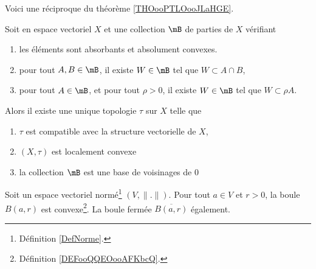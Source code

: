 Voici une réciproque du théorème \ref{THOooPTLOooJLaHGE}.

\begin{theorem}		\label{THOooKNXGooEebnxI}
	Soit en espace vectoriel \( X\) et une collection \( \mB\) de parties de \( X\) vérifiant
	\begin{enumerate}
		\item
		      les éléments sont absorbants et absolument convexes.
		\item
		      pour tout \( A,B\in \mB\), il existe \( W\in \mB\) tel que \( W\subset A\cap B\),
		\item
		      pour tout \( A\in \mB\), et pour tout \( \rho>0\), il existe \( W\in \mB\) tel que \( W\subset \rho A\).
	\end{enumerate}
	Alors il existe une unique topologie \( \tau\) sur \( X\) telle que
	\begin{enumerate}
		\item
		      \( \tau\) est compatible avec la structure vectorielle de \( X\),
		\item
		      \( (X,\tau)\) est localement convexe
		\item
		      la collection \( \mB\) est une base de voisinages de \( 0\)
	\end{enumerate}
\end{theorem}




\begin{proposition}     \label{PROPooUQLUooDQfYLT}
	Soit un espace vectoriel normé\footnote{Définition \ref{DefNorme}.} \( (V,\| . \|)\). Pour tout \( a\in V\) et \( r>0\), la boule \( B(a,r)\) est convexe\footnote{Définition \ref{DEFooQQEOooAFKbcQ}.}. La boule fermée \( \overline{ B(a,r) }\) également.
\end{proposition}

